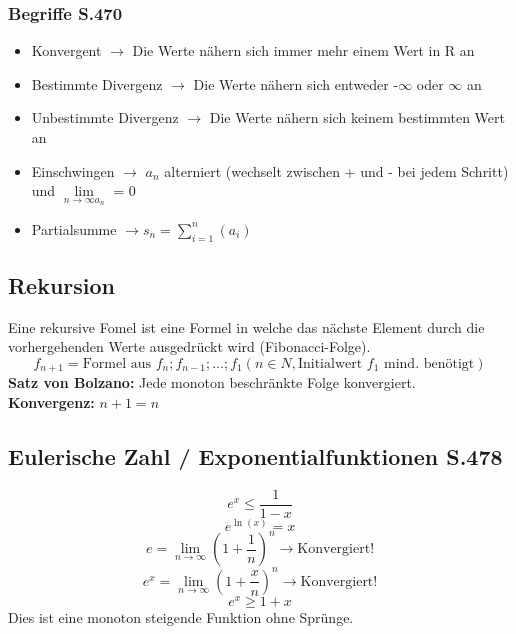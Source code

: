 \documentclass{article}
\begin{document}
	\subsubsection{Begriffe S.470}
	\begin{itemize}
		\item Konvergent $\rightarrow$ Die Werte nähern sich immer mehr einem Wert in R an 
		\item Bestimmte Divergenz $\rightarrow$ Die Werte nähern sich entweder -$\infty$ oder $\infty$ an
		\item Unbestimmte Divergenz $\rightarrow$ Die Werte nähern sich keinem bestimmten Wert an 
		\item Einschwingen $\rightarrow$ $ a_n$ alterniert (wechselt zwischen + und - bei jedem Schritt) und $\lim\limits_{n \rightarrow \infty a_n}$ = 0
		\item Partialsumme $\rightarrow s_n = \sum_{i = 1}^{n} (a_i)$ 
	\end{itemize}
	\subsection{Rekursion}
	Eine rekursive Fomel ist eine Formel in welche das nächste Element durch die vorhergehenden Werte ausgedrückt wird (Fibonacci-Folge).
	\begin{equation}
		f_{n+1} = \textrm{Formel aus } f_n;f_{n-1}; \dots ; f_1 (n \in N, \textrm{Initialwert } f_1 \textrm{ mind. benötigt})
	\end{equation}
	\textbf{Satz von Bolzano:} Jede monoton beschränkte Folge konvergiert. \\
	\textbf{Konvergenz: } $n+1 = n$
	\subsection{Eulerische Zahl / Exponentialfunktionen S.478}
	\begin{equation}
	    e^x \leq \frac{1}{1-x}
	\end{equation}
		\begin{equation}
	    e^{\ln(x)} = x
	\end{equation}
	\begin{equation}
	    e =\lim\limits_{n \rightarrow \infty} (1 + \frac{1}{n})^n \rightarrow \textrm{Konvergiert!}
	\end{equation}
	\begin{equation}
	    e^x =\lim\limits_{n \rightarrow \infty} (1 + \frac{x}{n})^n \rightarrow \textrm{Konvergiert!}
	\end{equation}
	\begin{equation*}
	    e^x \geq 1 + x
	\end{equation*}
	Dies ist eine monoton steigende Funktion ohne Sprünge.
	\newpage
\end{document}
